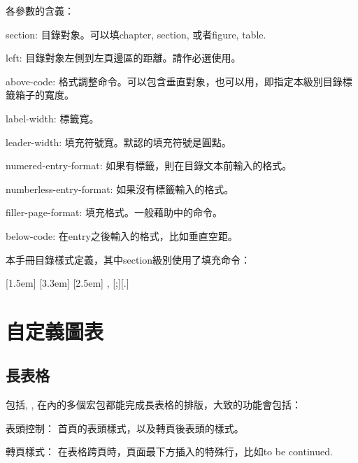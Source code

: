 各參數的含義：
\begin{para}
\item[section:] 目錄對象。可以填chapter, section, 或者figure, table.
\item[left:] 目錄對象左側到左頁邊區的距離。請作必選使用。
\item[above-code:] 格式調整命令。可以包含垂直對象，也可以用，即指定本級別目錄標籤箱子的寬度。
\item[label-width:] 標籤寬。
\item[leader-width:] 填充符號寬。默認的填充符號是圓點。
\item[numered-entry-format:] 如果有標籤，則在目錄文本前輸入的格式。
\item[numberless-entry-format:] 如果沒有標籤輸入的格式。
\item[filler-page-format:] 填充格式。一般藉助中的命令。
\item[below-code:] 在entry之後輸入的格式，比如垂直空距。
\end{para}

本手冊目錄樣式定義，其中section級別使用了填充命令：
\begin{latex}
[1.5em]{}{\contentslabel{1.5em}}
    {\hspace*{-2em}}{\hfill\contentspage}
[3.3em]{}
    {\contentslabel{1.8em}}{\hspace*{-2.3em}}
    {\titlerule*[8pt]{$\cdot$}\contentspage}
[2.5em]{\small}
    {\thecontentslabel{}}{}
    {, \thecontentspage}[;\qquad][.]
\end{latex}

\section{自定義圖表}
\label{sec:figtab}
\subsection{長表格}
包括, , 在內的多個宏包都能完成長表格的排版，大致的功能會包括：
\begin{para}
\item[表頭控制：] 首頁的表頭樣式，以及轉頁後表頭的樣式。
\item[轉頁樣式：] 在表格跨頁時，頁面最下方插入的特殊行，比如to be continued.
\end{para}

